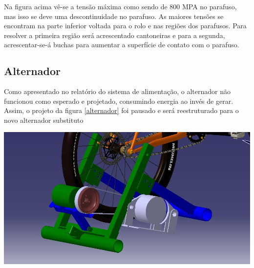     Na figura acima vê-se a tensão máxima como sendo de 800 MPA no parafuso, mas isso se deve uma descontinuidade no parafuso. As maiores tensões se encontram na parte inferior voltada para o rolo e nas regiões dos parafusos. Para resolver a primeira região será acrescentado cantoneiras e para a segunda, acrescentar-se-á buchas para aumentar a superfície de contato com o parafuso.

\subsection{Alternador}
 
    Como apresentado no relatório do sistema de alimentação, o alternador não funcionou como esperado e projetado, consumindo energia ao invés de gerar. Assim, o projeto da figura \ref{alternador} foi pausado e  será reestruturado para o novo alternador substituto

    \begin{center}
    	\includegraphics[scale=0.3]{figuras/alternador}
        \label{alternador}
    \end{center} 